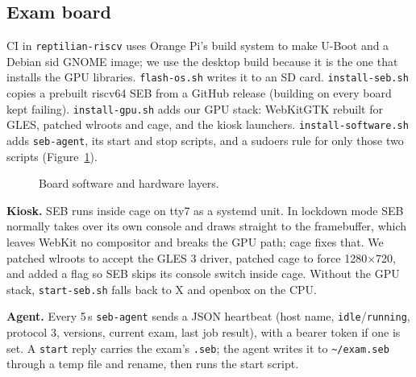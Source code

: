 \documentclass[11pt]{article}
\begin{document}
\subsection{Exam board}
CI in \texttt{reptilian-riscv} uses Orange Pi's build system to make U-Boot and a Debian sid GNOME image; we use the desktop build because it is the one that installs the GPU libraries. \texttt{flash-os.sh} writes it to an SD card. \texttt{install-seb.sh} copies a prebuilt riscv64 SEB from a GitHub release (building on every board kept failing). \texttt{install-gpu.sh} adds our GPU stack: WebKitGTK rebuilt for GLES, patched wlroots and cage, and the kiosk launchers. \texttt{install-software.sh} adds \texttt{seb-agent}, its start and stop scripts, and a sudoers rule for only those two scripts (Figure~\ref{fig:stack}).

\begin{figure}[H]
\centering
{}
\caption{Board software and hardware layers.}
\label{fig:stack}
\end{figure}

\textbf{Kiosk.} SEB runs inside cage on tty7 as a systemd unit. In lockdown mode SEB normally takes over its own console and draws straight to the framebuffer, which leaves WebKit no compositor and breaks the GPU path; cage fixes that. We patched wlroots to accept the GLES 3 driver, patched cage to force 1280$\times$720, and added a flag so SEB skips its console switch inside cage. Without the GPU stack, \texttt{start-seb.sh} falls back to X and openbox on the CPU.

\textbf{Agent.} Every 5\,s \texttt{seb-agent} sends a JSON heartbeat (host name, \texttt{idle}/\texttt{running}, protocol 3, versions, current exam, last job result), with a bearer token if one is set. A \texttt{start} reply carries the exam's \texttt{.seb}; the agent writes it to \texttt{\textasciitilde/exam.seb} through a temp file and rename, then runs the start script.
\end{document}
